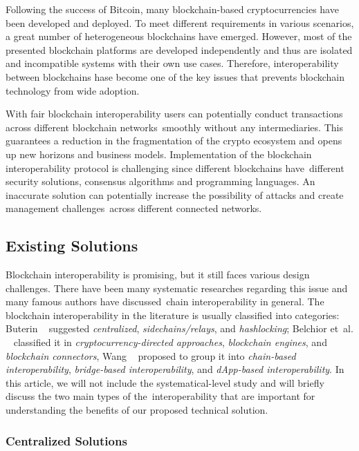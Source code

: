 Following the success of Bitcoin, many blockchain-based cryptocurrencies have been developed and deployed.
To meet different requirements in various scenarios, a great number of heterogeneous blockchains have emerged.
However, most of the presented blockchain platforms are developed independently and thus are
isolated and incompatible systems with their own use cases.
Therefore, interoperability between blockchains hase become one of the key issues
that prevents blockchain technology from wide adoption.

With fair blockchain interoperability users can potentially conduct transactions across different blockchain networks\
smoothly without any intermediaries.
This guarantees a reduction in the fragmentation of the crypto ecosystem and opens up new horizons and business models.
Implementation of the blockchain interoperability protocol is challenging since different blockchains have\
different security solutions, consensus algorithms and programming languages.
An inaccurate solution can potentially increase the possibility of attacks and create management challenges\
across different connected networks.

\subsection{Existing Solutions}\label{subsec:existing-solutions}
Blockchain interoperability is promising, but it still faces various design
challenges.
There have been many systematic researches regarding this issue and many famous authors have discussed\
chain interoperability in general.
The blockchain interoperability in the literature is usually classified into categories: Buterin ~\cite{buterin2016}
suggested \emph{centralized}, \emph{sidechains/relays}, and \emph{hashlocking}; Belchior et\
al. ~\cite{belchior2021survey} classified it in \emph{cryptocurrency-directed approaches}, \emph{blockchain engines}, and \emph{blockchain connectors},
Wang ~\cite{cryptoeprint:2021/537} proposed to group it into \emph{chain-based interoperability},
\emph{bridge-based interoperability}, and \emph{dApp-based interoperability}.
In this article, we will not include the systematical-level study and will briefly discuss the two main types of the\
interoperability that are important for understanding the benefits of our proposed technical solution.

\subsubsection{Centralized Solutions}\label{subsubsec:centralized-solutions}

